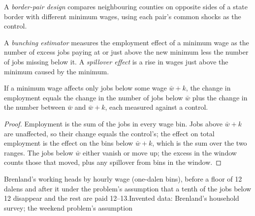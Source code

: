 \begin{definition}\label{def:b3:minimum-wage:border-pair}
A \emph{border-pair design} compares neighbouring counties on opposite sides of a
state border with different minimum wages, using each pair's common shocks as the
control.
\end{definition}

\begin{definition}\label{def:b3:minimum-wage:bunching}
A \emph{bunching estimator} measures the employment effect of a minimum wage as the
number of excess jobs paying at or just above the new minimum less the number of
jobs missing below it. A \emph{spillover effect} is a rise in wages just above the
minimum caused by the minimum.
\end{definition}

\begin{proposition}\label{prop:b3:minimum-wage:bunching}
If a minimum wage affects only jobs below some wage $\bar w + k$, the change in employment
equals the change in the number of jobs below $\bar w$ plus the change in the number between
$\bar w$ and $\bar w + k$, each measured against a control.
\end{proposition}

\begin{proof}
Employment is the sum of the jobs in every wage bin. Jobs above $\bar w + k$ are unaffected,
so their change equals the control's; the effect on total employment is the effect
on the bins below $\bar w + k$, which is the sum over the two ranges. The jobs below $\bar w$
either vanish or move up; the excess in the window counts those that moved, plus any
spillover from bins in the window.
\end{proof}

\begin{omchart}{Brenland's working heads by hourly wage (one-dalen bins), before a
floor of 12 dalens and after it under the problem's assumption that a tenth of the jobs
below 12 disappear and the rest are paid 12--13.}{Invented data: Brenland's household
survey; the weekend problem's assumption}
\end{omchart}

